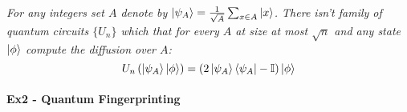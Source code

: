 \documentclass{article}
\begin{document}
\paragraph{}
\textit{For  any integers set \(A\) denote by \( \ket{\psi_{A}} = \frac{1}{\sqrt{A}}\sum_{x\in A}{\ket{x}}\). There isn't family of quantum circuits \(\{U_{n}\}\) which that for every \(A\) at size at most \(\sqrt{n}\) and any state \(\ket{\phi}\) compute the diffusion over \(A\): }
\begin{equation*}
    U_{n}\left( \ket{\psi_{A}}\ket{\phi} \right) = \left( 2\ket{\psi_{A}}\bra{\psi_{A}} - \mathbb{I} \right)\ket{\phi}
\end{equation*}

\paragraph{Ex2 - Quantum Fingerprinting }
\end{document}
